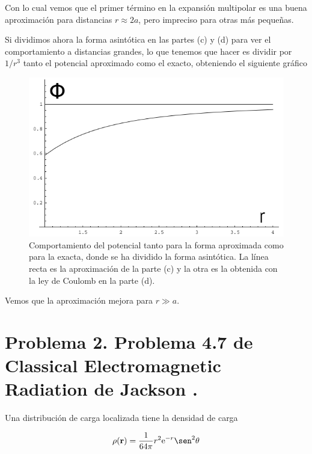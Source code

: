 \documentclass[a4paper,11pt]{article}
\numberwithin{equation}{section}
\newcommand{\euler}{\mathrm{e}}
\begin{document}
Con lo cual vemos que el primer término en la expansión multipolar es una buena 
aproximación para distancias $r \approx 2a$, pero impreciso para otras más pequeñas.

\vspace{.3cm}

Si dividimos ahora la forma asintótica en las partes (c) y (d) para ver el comportamiento 
a distancias grandes, lo que tenemos que hacer es dividir por $1/r^3$ tanto 
el potencial aproximado como el exacto, obteniendo el siguiente gráfico

\begin{figure}[H]
\center 
\includegraphics[scale=0.6]{problema1fig4}
\caption{Comportamiento del potencial tanto para la forma aproximada como para 
la exacta, donde se ha dividido la forma asintótica. La línea recta es la aproximación 
de la parte (c) y la otra es la obtenida con la ley de Coulomb en la parte (d).}
\end{figure}

Vemos que la aproximación mejora para $r \gg a$. 

\newpage

\section{Problema 2. Problema 4.7 de Classical Electromagnetic Radiation
de Jackson \cite{jackson}.}

Una distribución de carga localizada tiene la densidad de carga 

$$
\rho(\mathbf{r}) = \frac{1}{64\pi}r^2\euler^{-r}\sen^2{\theta}
$$
\end{document}
